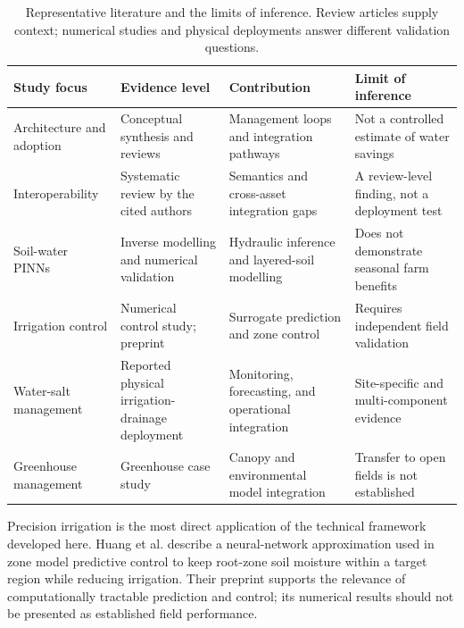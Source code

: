 \documentclass[acmsmall,screen,nonacm]{acmart}
\begin{document}
\begin{table}[!htbp]
\caption{Representative literature and the limits of inference. Review articles supply context; numerical studies and physical deployments answer different validation questions.}
\label{tab:1}
\centering
\small
\begin{tabular}{>{\raggedright\arraybackslash}p{}>{\raggedright\arraybackslash}p{}>{\raggedright\arraybackslash}p{}>{\raggedright\arraybackslash}p{}}
\toprule
\textbf{Study focus} & \textbf{Evidence level} & \textbf{Contribution} & \textbf{Limit of inference} \\
\midrule
Architecture and adoption \cite{R01,R02,R03} & Conceptual synthesis and reviews & Management loops and integration pathways & Not a controlled estimate of water savings \\
Interoperability \cite{R04} & Systematic review by the cited authors & Semantics and cross-asset integration gaps & A review-level finding, not a deployment test \\
Soil-water PINNs \cite{R15,R16} & Inverse modelling and numerical validation & Hydraulic inference and layered-soil modelling & Does not demonstrate seasonal farm benefits \\
Irrigation control \cite{R18} & Numerical control study; preprint & Surrogate prediction and zone control & Requires independent field validation \\
Water-salt management \cite{R19} & Reported physical irrigation-drainage deployment & Monitoring, forecasting, and operational integration & Site-specific and multi-component evidence \\
Greenhouse management \cite{R20} & Greenhouse case study & Canopy and environmental model integration & Transfer to open fields is not established \\
\bottomrule
\end{tabular}

\end{table}

Precision irrigation is the most direct application of the technical framework developed here. Huang et al. \cite{R18} describe a neural-network approximation used in zone model predictive control to keep root-zone soil moisture within a target region while reducing irrigation. Their preprint supports the relevance of computationally tractable prediction and control; its numerical results should not be presented as established field performance.
\end{document}
